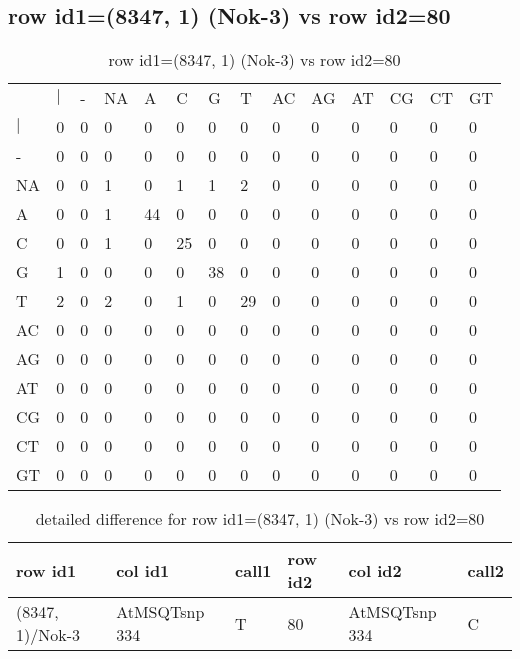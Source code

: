 \subsection{row id1=(8347, 1) (Nok-3) vs row id2=80}
\begin{center}
\begin{longtable}{|l|l|l|l|l|l|l|l|l|l|l|l|l|l|}
\caption{row id1=(8347, 1) (Nok-3) vs row id2=80} \label{table_dm360}\\
\hline
\\
\hline
&$|$&-&NA&A&C&G&T&AC&AG&AT&CG&CT&GT\\
$|$&0&0&0&0&0&0&0&0&0&0&0&0&0\\
-&0&0&0&0&0&0&0&0&0&0&0&0&0\\
NA&0&0&1&0&1&1&2&0&0&0&0&0&0\\
A&0&0&1&44&0&0&0&0&0&0&0&0&0\\
C&0&0&1&0&25&0&0&0&0&0&0&0&0\\
G&1&0&0&0&0&38&0&0&0&0&0&0&0\\
T&2&0&2&0&1&0&29&0&0&0&0&0&0\\
AC&0&0&0&0&0&0&0&0&0&0&0&0&0\\
AG&0&0&0&0&0&0&0&0&0&0&0&0&0\\
AT&0&0&0&0&0&0&0&0&0&0&0&0&0\\
CG&0&0&0&0&0&0&0&0&0&0&0&0&0\\
CT&0&0&0&0&0&0&0&0&0&0&0&0&0\\
GT&0&0&0&0&0&0&0&0&0&0&0&0&0\\
\hline
\end{longtable}
\end{center}

\begin{center}
\begin{longtable}{|l|l|l|l|l|l|}
\caption{detailed difference for row id1=(8347, 1) (Nok-3) vs row id2=80} \label{table_dm361}\\
\hline
row id1&col id1&call1&row id2&col id2&call2\\
\hline
(8347, 1)/Nok-3&AtMSQTsnp 334&T&80&AtMSQTsnp 334&C\\
\hline
\end{longtable}
\end{center}

